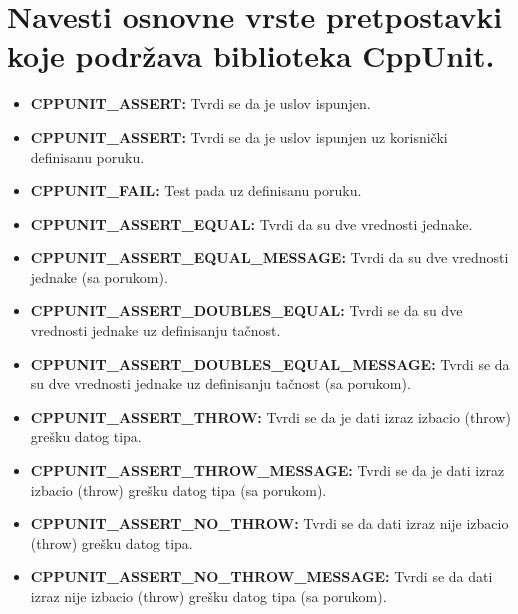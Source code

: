 \documentclass[a4paper]{article}
\begin{document}
\section{Navesti osnovne vrste pretpostavki koje podržava biblioteka CppUnit.}
  \begin{itemize}
    \item \textbf{CPPUNIT\_ASSERT:} Tvrdi se da je uslov ispunjen.
    \item \textbf{CPPUNIT\_ASSERT:} Tvrdi se da je uslov ispunjen uz korisnički definisanu poruku.
    \item \textbf{CPPUNIT\_FAIL:} Test pada uz definisanu poruku.
    \item \textbf{CPPUNIT\_ASSERT\_EQUAL:} Tvrdi da su dve vrednosti jednake.
    \item \textbf{CPPUNIT\_ASSERT\_EQUAL\_MESSAGE:} Tvrdi da su dve vrednosti jednake (sa porukom).
    \item \textbf{CPPUNIT\_ASSERT\_DOUBLES\_EQUAL:} Tvrdi se da su dve vrednosti jednake uz
          definisanju tačnost.
    \item \textbf{CPPUNIT\_ASSERT\_DOUBLES\_EQUAL\_MESSAGE:} Tvrdi se da su dve vrednosti jednake uz
          definisanju tačnost (sa porukom).
    \item \textbf{CPPUNIT\_ASSERT\_THROW:} Tvrdi se da je dati izraz izbacio (throw) grešku datog tipa.
    \item \textbf{CPPUNIT\_ASSERT\_THROW\_MESSAGE:} Tvrdi se da je dati izraz izbacio (throw) grešku datog tipa
          (sa porukom).
    \item \textbf{CPPUNIT\_ASSERT\_NO\_THROW:} Tvrdi se da dati izraz nije izbacio (throw) grešku datog tipa.
    \item \textbf{CPPUNIT\_ASSERT\_NO\_THROW\_MESSAGE:} Tvrdi se da dati izraz nije izbacio (throw) grešku datog tipa
          (sa porukom). \cite{cppunit_asserts}
  \end{itemize} 
\end{document}
